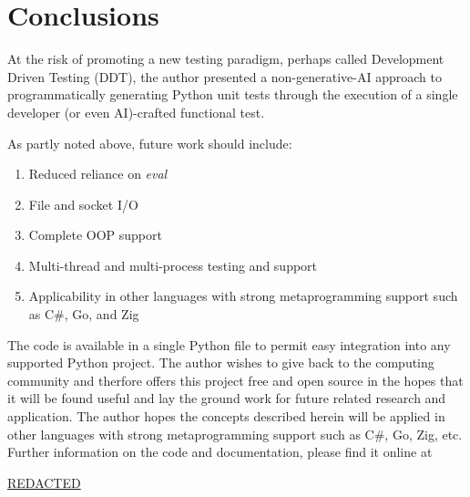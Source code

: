\section{Conclusions}\label{sec:conclusions}

At the risk of promoting a new testing paradigm, perhaps 
called Development Driven Testing (DDT), the author 
presented a non-generative-AI approach to 
programmatically generating Python unit tests through
the execution of a single developer (or even AI)-crafted
functional test.

As partly noted above, future work should include: 
\begin{enumerate}
  \item Reduced reliance on \textit{eval}
  \item File and socket I/O
  \item Complete OOP support
  \item Multi-thread and multi-process testing and support
  \item Applicability in other languages with strong metaprogramming support such as C\#, Go, and Zig
\end{enumerate}

The code is available in a single Python file to permit 
easy integration into any supported Python project.
The author wishes to give back to the computing community
and therfore offers this project free and open source
in the hopes that it will be found useful and lay the ground
work for future related research and application.
The author hopes the concepts described herein will be 
applied in other languages with strong metaprogramming support
such as C\#, Go, Zig, etc.  Further information on the code and  documentation, please
find it online at
%
\begin{center}
  \url{REDACTED}
\end{center}


